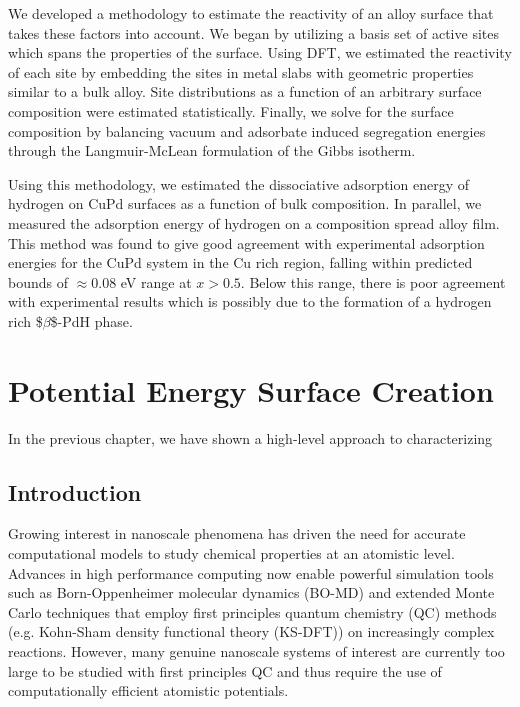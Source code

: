 \documentclass[12pt]{cmuthesis}
\begin{document}
We developed a methodology to estimate the reactivity of an alloy surface that takes these factors into account. We began by utilizing a basis set of active sites which spans the properties of the surface. Using DFT, we estimated the reactivity of each site by embedding the sites in metal slabs with geometric properties similar to a bulk alloy. Site distributions as a function of an arbitrary surface composition were estimated statistically. Finally, we solve for the surface composition by balancing vacuum and adsorbate induced segregation energies through the Langmuir-McLean formulation of the Gibbs isotherm.

Using this methodology, we estimated the dissociative adsorption energy of hydrogen on CuPd surfaces as a function of bulk composition. In parallel, we measured the adsorption energy of hydrogen on a composition spread alloy film.  This method was found to give good agreement with experimental adsorption energies for the CuPd system in the Cu rich region, falling within predicted bounds of \(\approx 0.08\) eV range at \(x > 0.5\). Below this range, there is poor agreement with experimental results which is possibly due to the formation of a hydrogen rich \$\(\beta\)\$-PdH phase.

\chapter{Potential Energy Surface Creation}
\label{sec:ch3}
In the previous chapter, we have shown a high-level approach to characterizing

\section{Introduction}
\label{sec:org1d5f726}
Growing interest in nanoscale phenomena has driven the need for accurate computational models to study chemical properties at an atomistic level. Advances in high performance computing now enable powerful simulation tools such as Born-Oppenheimer molecular dynamics (BO-MD) and extended Monte Carlo techniques that employ first principles quantum chemistry (QC) methods (e.g. Kohn-Sham density functional theory (KS-DFT)) on increasingly complex reactions. However, many genuine nanoscale systems of interest are currently too large to be studied with first principles QC and thus require the use of computationally efficient atomistic potentials.
\end{document}

